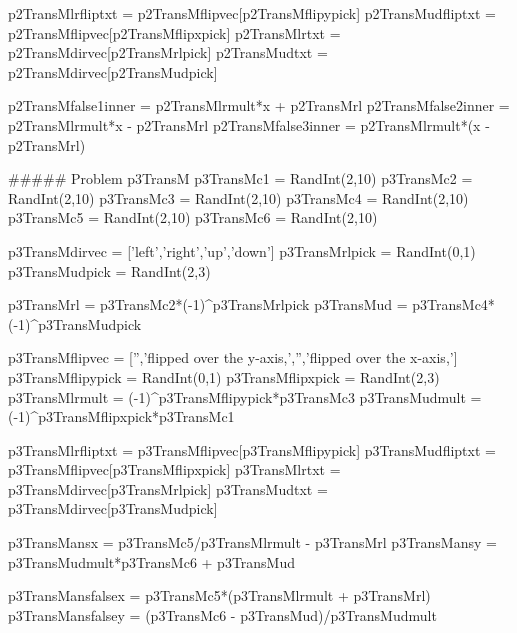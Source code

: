 \documentclass{ximera}
\begin{document}
\begin{MCQuestions}
\begin{sagesilent}
p2TransMlrfliptxt = p2TransMflipvec[p2TransMflipypick]
p2TransMudfliptxt = p2TransMflipvec[p2TransMflipxpick]
p2TransMlrtxt = p2TransMdirvec[p2TransMrlpick]
p2TransMudtxt = p2TransMdirvec[p2TransMudpick]

p2TransMfalse1inner = p2TransMlrmult*x + p2TransMrl
p2TransMfalse2inner = p2TransMlrmult*x - p2TransMrl
p2TransMfalse3inner = p2TransMlrmult*(x - p2TransMrl)



##### Problem p3TransM
p3TransMc1 = RandInt(2,10)
p3TransMc2 = RandInt(2,10)
p3TransMc3 = RandInt(2,10)
p3TransMc4 = RandInt(2,10)
p3TransMc5 = RandInt(2,10)
p3TransMc6 = RandInt(2,10)

p3TransMdirvec = ['left','right','up','down']
p3TransMrlpick = RandInt(0,1)
p3TransMudpick = RandInt(2,3)

p3TransMrl = p3TransMc2*(-1)^p3TransMrlpick
p3TransMud = p3TransMc4*(-1)^p3TransMudpick

p3TransMflipvec = ['','flipped over the y-axis,','','flipped over the x-axis,']
p3TransMflipypick = RandInt(0,1)
p3TransMflipxpick = RandInt(2,3)
p3TransMlrmult = (-1)^p3TransMflipypick*p3TransMc3
p3TransMudmult = (-1)^p3TransMflipxpick*p3TransMc1

p3TransMlrfliptxt = p3TransMflipvec[p3TransMflipypick]
p3TransMudfliptxt = p3TransMflipvec[p3TransMflipxpick]
p3TransMlrtxt = p3TransMdirvec[p3TransMrlpick]
p3TransMudtxt = p3TransMdirvec[p3TransMudpick]


p3TransMansx = p3TransMc5/p3TransMlrmult - p3TransMrl
p3TransMansy = p3TransMudmult*p3TransMc6 + p3TransMud

p3TransMansfalsex = p3TransMc5*(p3TransMlrmult + p3TransMrl)
p3TransMansfalsey = (p3TransMc6 - p3TransMud)/p3TransMudmult



\end{sagesilent}











\end{MCQuestions}
\end{document}
